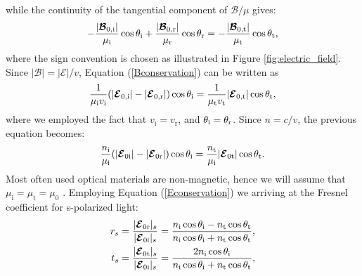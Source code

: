 while the continuity of the tangential component of $\boldsymbol{\mathcal{B}}/\mu$ gives:
\begin{equation}\label{Bconservation}
-\frac{|\boldsymbol{\mathcal{B}}_{0,\textrm{i}}|}{\mu_\textrm{i}}\cos\theta_{\textrm{i}}+\frac{|\boldsymbol{\mathcal{B}}_{0,\textrm{r}}|}{\mu_\textrm{r}}\cos\theta_{\textrm{r}} = 
-\frac{|\boldsymbol{\mathcal{B}}_{0,\textrm{t}}|}{\mu_\textrm{t}}\cos\theta_{\textrm{t}},
\end{equation}
where the sign convention is chosen as illustrated in Figure \ref{fig:electric_field}.
Since $|\boldsymbol{\mathcal{B}}| = |\boldsymbol{\mathcal{E}}|/v$, Equation (\ref{Bconservation}) can be written as 
\begin{equation}
\frac{1}{\mu_{\textrm{i}}v_{\textrm{i}}}(|\boldsymbol{\mathcal{E}}_{0,\textrm{i}}|-|\boldsymbol{\mathcal{E}}_{0,\textrm{r}}|)\cos\theta_{\textrm{i}} = \frac{1}{\mu_{\textrm{t}}v_{\textrm{t}}}|\boldsymbol{\mathcal{E}}_{0,\textrm{t}}|\cos\theta_{\textrm{t}},
\end{equation}
where we employed the fact that $v_{\textrm{i}}= v_{\textrm{r}}$, and $\theta_{\textrm{i}}= \theta_{\textrm{r}}$. 
Since $n = c/v$, the previous equation becomes:
\begin{equation}
\frac{n_{\textrm{i}}}{\mu_{\textrm{i}}}(|\boldsymbol{\mathcal{E}}_{0\textrm{i}}|-|\boldsymbol{\mathcal{E}}_{0\textrm{r}}|)\cos\theta_{\textrm{i}} = \frac{n_{\textrm{t}}}{\mu_{\textrm{i}}}|\boldsymbol{\mathcal{E}}_{0\textrm{t}}|\cos\theta_{\textrm{t}}.
\end{equation}
Most often used optical materials are non-magnetic, hence we will assume that $\mu_{\textrm{i}}=\mu_{\textrm{t}}=\mu_{0}$ \cite{lvovsky2013fresnel}. Employing Equation (\ref{Econservation}) we arriving at the Fresnel coefficient for s-polarized light:
\begin{equation} \label{Fresnel_perpendicular}
\begin{split}
r_{s} & =\frac{|\boldsymbol{\mathcal{E}}_{0 \textrm{r}}|_{s}}{|\boldsymbol{\mathcal{E}}_{0\textrm{i}}|_s} = 
\frac{n_\textrm{i}\cos\theta_\textrm{i}-n_\textrm{t} \cos\theta_\textrm{t}}{n_\textrm{i}
\cos\theta_\textrm{i}+n_\textrm{t}\cos\theta_\textrm{t}},\\
t_{s} & = \frac{|\boldsymbol{\mathcal{E}}_{0 \textrm{t}}|_s}{|\boldsymbol{\mathcal{E}}_{0\textrm{i}}|_s} 
=\frac{2n_\textrm{i}\cos\theta_\textrm{i}}{n_\textrm{i}\cos\theta_\textrm{i}+n_\textrm{t}\cos\theta_\textrm{t}},\\
\end{split}
\end{equation}
